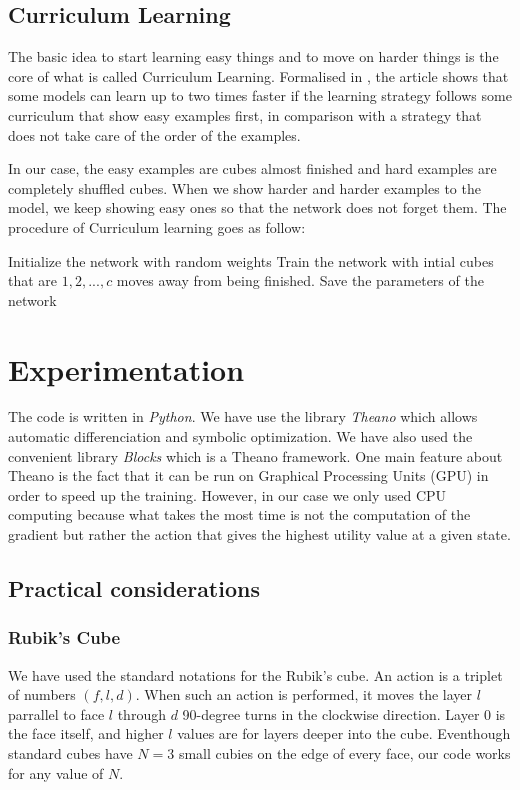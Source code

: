 \documentclass{article} %
\begin{document}
\subsection{Curriculum Learning}
The basic idea to start learning easy things and to move on harder things is the core of what is called Curriculum Learning. Formalised in \cite{curriculum}, the article shows that some models can learn up to two times faster if the learning strategy follows some curriculum that show easy examples first, in comparison with a strategy that does not take care of the order of the examples.

In our case, the easy examples are cubes almost finished and hard examples are completely shuffled cubes. When we show harder and harder examples to the model, we keep showing easy ones so that the network does not forget them. The procedure of Curriculum learning goes as follow:

\begin{algorithm}
\begin{algorithmic}[1]
\STATE Initialize the network with random weights
\STATE Train the network with intial cubes that are $1, 2, ..., c$ moves away from being finished.
\STATE Save the parameters of the network

\ENDFOR
\end{algorithmic}
\end{algorithm}

\section{Experimentation}

The code is written in \textit{Python}. We have use the library \textit{Theano} which allows automatic differenciation and symbolic optimization. We have also used the convenient library \textit{Blocks} which is a Theano framework. One main feature about Theano is the fact that it can be run on Graphical Processing Units (GPU) in order to speed up the training. However, in our case we only used CPU computing because what takes the most time is not the computation of the gradient but rather the action that gives the highest utility value at a given state.


\subsection{Practical considerations}

\subsubsection{Rubik's Cube}
\label{action}
We have used the standard notations for the Rubik's cube. An action is a triplet of numbers $(f, l, d)$. When such an action is performed, it moves the layer $l$ parrallel to face $l$ through $d$ 90-degree turns in the clockwise direction. Layer $0$ is the face itself, and higher $l$ values are for layers deeper into the cube. Eventhough standard cubes have $N=3$ small cubies on the edge of every face, our code works for any value of $N$.
\end{document}
